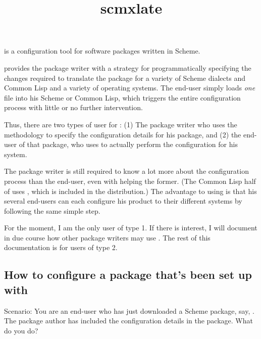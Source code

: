 


\title{scmxlate}

\ignorenextinputtimestamp

\centerline{}

\centerline{}

\medskip

 is a configuration tool for software
packages written in Scheme.   

 provides the package writer with a
strategy for programmatically specifying the changes
required to translate the package for a variety of
Scheme dialects and Common Lisp and a variety of
operating systems.  The end-user simply loads {\em one}
file into his Scheme or Common Lisp, which triggers the
entire configuration process with little or no
further intervention. 

Thus, there are two types of user for :
(1) The package writer who uses the 
methodology to specify the configuration details for
his package, and (2) the end-user of that package, who uses
 to actually perform the configuration for
his system.  

The package writer is still required to know a lot more
about the configuration process than the end-user, even
with  helping the former.  (The Common Lisp half
of  uses ,
which is included in the  distribution.)
The advantage to using  is that his several
end-users can each configure his product to their
different systems by following the same simple
step.  

For the moment, I am the only  user of type
1.  If there is interest, I will document in due course
how other package writers may use .
The rest of this documentation is for 
users of type 2.

\subsection*{How to configure a package that's been set
up with }

Scenario: You are an end-user who has just downloaded a
Scheme package, say,
.
The package author has included the 
configuration details in the package.  What do you do?

